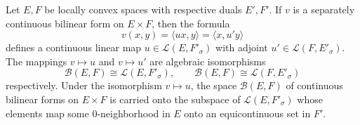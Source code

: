 Let $E, F$ be locally convex spaces with respective duals $E', F'$. If $v$ is a separately continuous bilinear form on $E \times F$, then the formula
$$v(x, y) = \langle ux, y \rangle = \langle x, u'y \rangle$$
defines a continuous linear map $u \in \mathcal{L}(E, F'_\sigma)$ with adjoint $u' \in \mathcal{L}(F, E'_\sigma)$. The mappings $v \mapsto u$ and $v \mapsto u'$ are algebraic isomorphisms
$$\mathcal{B}(E, F) \cong \mathcal{L}(E, F'_\sigma), \qquad \mathcal{B}(E, F) \cong \mathcal{L}(F, E'_\sigma)$$
respectively. Under the isomorphism $v \mapsto u$, the space $\mathcal{B}(E, F)$ of continuous bilinear forms on $E \times F$ is carried onto the subspace of $\mathcal{L}(E, F'_\sigma)$ whose elements map some $0$-neighborhood in $E$ onto an equicontinuous set in $F'$.
